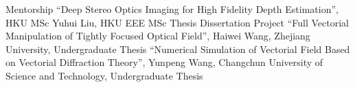\begin{rubric}{Mentorship}
    \entry*[2023]%
        ``Deep Stereo Optics Imaging for High Fidelity Depth Estimation'', HKU MSc Yuhui Liu, HKU EEE MSc Thesis Dissertation Project
    \entry*[2022]%
        ``Full Vectorial Manipulation of Tightly Focused Optical Field'', Haiwei Wang, Zhejiang University, Undergraduate Thesis
    \entry*[2022]%
        ``Numerical Simulation of Vectorial Field Based on Vectorial Diffraction Theory'', Yunpeng Wang, Changchun University of Science and Technology, Undergraduate Thesis
\end{rubric}